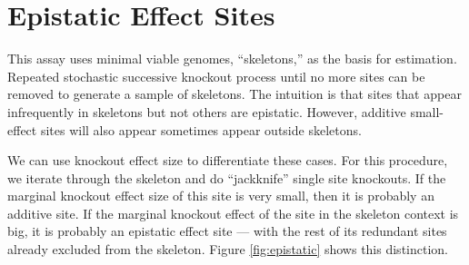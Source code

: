 
\section{Epistatic Effect Sites}



This assay uses minimal viable genomes, ``skeletons,'' as the basis for estimation.
Repeated stochastic successive knockout process until no more sites can be removed to generate a sample of skeletons.
The intuition is that sites that appear infrequently in skeletons but not others are epistatic.
However, additive small-effect sites will also appear sometimes appear outside skeletons.

We can use knockout effect size to differentiate these cases.
For this procedure, we iterate through the skeleton and do ``jackknife'' single site knockouts.
If the marginal knockout effect size of this site is very small, then it is probably an additive site.
If the marginal knockout effect of the site in the skeleton context is big, it is probably an epistatic effect site --- with the rest of its redundant sites already excluded from the skeleton.
Figure \ref{fig:epistatic} shows this distinction.






